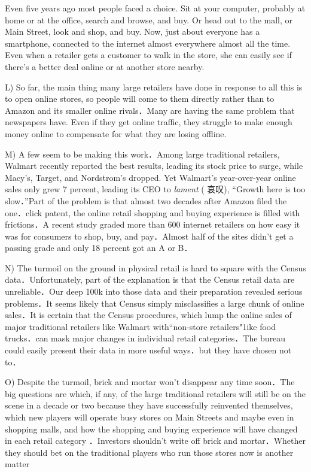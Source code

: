 \documentclass[UTF8,11pt]{ctexart}
\begin{document}
Even five years ago most people faced a choice. Sit at your computer, probably at home or at the office, search and browse, and buy. Or head out to the mall, or Main Street, look and shop, and buy. Now, just about everyone has a smartphone, connected to the internet almost everywhere almost all the time. Even when a retailer gets a customer to walk in the store, she can easily see if there’s a better deal online or at another store nearby.


L) So far, the main thing many large retailers have done in response to all this is to open online stores, so people will come to them directly rather than to Amazon and its smaller online rivals．Many are having the same problem that newspapers have. Even if they get online traffic, they struggle to make enough money online to compensate for what they are losing offline.


M) A few seem to be making this work．Among large traditional retailers, Walmart recently reported the best results, leading its stock price to surge, while Macy’s, Target, and Nordstrom’s dropped. Yet Walmart’s year-over-year online sales only grew 7 percent, leading its CEO to\textit{ lament} ( 哀叹), “Growth here is too slow．”Part of the problem is that almost two decades after Amazon filed the one．click patent, the online retail shopping and buying experience is filled with frictions．A recent study graded more than 600 internet retailers on how easy it was for consumers to shop, buy, and pay．Almost half of the sites didn’t get a passing grade and only 18 percent got an A or B．


N) The turmoil on the ground in physical retail is hard to square with the Census data．Unfortunately, part of the explanation is that the Census retail data are unreliable．Our deep 100k into those data and their preparation revealed serious problems．It seems likely that Census simply misclassifies a large chunk of online sales．It is certain that the Census procedures, which lump the online sales of major traditional retailers like Walmart with“non-store retailers"1ike food trucks．can mask major changes in individual retail categories．The bureau could easily present their data in more useful ways．but they have chosen not to．


O) Despite the turmoil, brick and mortar won’t disappear any time soon．The big questions are which, if any, of the large traditional retailers will still be on the scene in a decade or two because they have successfully reinvented themselves, which new players will operate busy stores on Main Streets and maybe even in shopping malls, and how the shopping and buying experience will have changed in each retail category ．Investors shouldn’t write off brick and mortar．Whether they should bet on the traditional players who run those stores now is another matter
\end{document}
